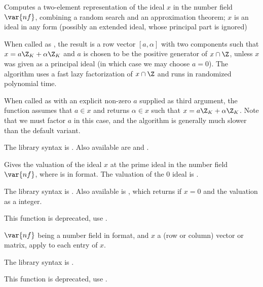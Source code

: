 \label{se:idealtwoelt}
Computes a two-element
representation of the ideal $x$ in the number field $\var{nf}$, combining a
random search and an approximation theorem; $x$ is an ideal
in any form (possibly an extended ideal, whose principal part is ignored)

\item When called as , the result is a row vector
$[a,\alpha]$ with two components such that $x=a\Z_K+\alpha\Z_K$ and $a$ is
chosen to be the positive generator of $x\cap\Z$, unless $x$ was given as a
principal ideal (in which case we may choose $a = 0$). The algorithm
uses a fast lazy factorization of $x\cap \Z$ and runs in randomized
polynomial time.

\item When called as  with an explicit non-zero $a$
supplied as third argument, the function assumes that $a \in x$ and returns
$\alpha\in x$ such that $x = a\Z_K + \alpha\Z_K$. Note that we must factor
$a$ in this case, and the algorithm is generally much slower than the
default variant.

The library syntax is .
Also available are
 and
.

\label{se:idealval}
Gives the valuation of the ideal $x$ at the prime ideal  in the
number field $\var{nf}$, where  is in  format.
The valuation of the $0$ ideal is .

The library syntax is .
Also available is
, which returns
 if $x = 0$ and the valuation as a  integer.

\label{se:matalgtobasis}
This function is deprecated, use .

$\var{nf}$ being a number field in  format, and $x$ a
(row or column) vector or matrix, apply  to each entry
of $x$.

The library syntax is .

\label{se:matbasistoalg}
This function is deprecated, use .

